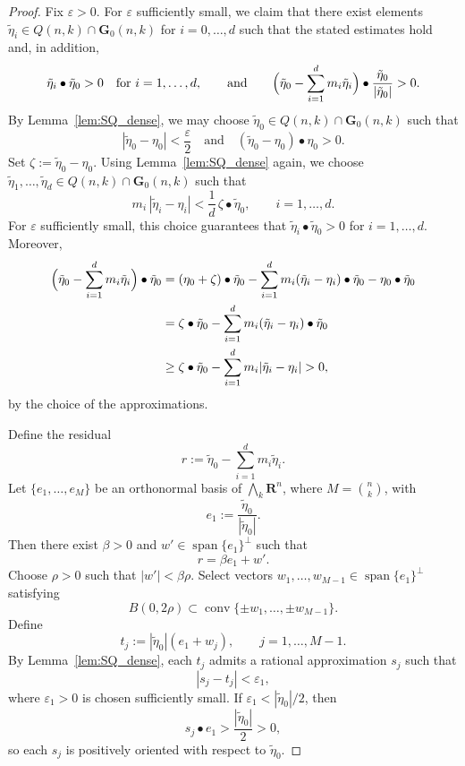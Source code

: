 \documentclass[a4paper,twoside,reqno]{article}
\theoremstyle{definition}
\theoremstyle{remark}
\theoremstyle{plain}
\theoremstyle{remark}
\theoremstyle{definition}
\newcommand{\ograss}[2]{\mathbf{G}_0(#1,#2)}
\newcommand{\R}{\mathbf{R}}
\begin{document}
\begin{proof}
    Fix $\varepsilon>0$.
    For $\varepsilon$ sufficiently small, we claim that there exist elements
    $\tilde\eta_i\in Q(n,k)\cap\ograss nk$ for $i=0,\dots,d$ such that the stated
    estimates hold and, in addition,
    \[
        \tilde\eta_i\bullet\tilde\eta_0>0
        \quad\text{for }i=1,\dots,d,
        \qquad\text{and}\qquad
        \Bigl(\tilde\eta_0-\sum_{i=1}^d m_i\tilde\eta_i\Bigr)\bullet
        \frac{\tilde\eta_0}{|\tilde\eta_0|}>0.
    \]
    By Lemma~\ref{lem:SQ_dense}, we may choose
    $\tilde\eta_0\in Q(n,k)\cap\ograss nk$ such that
    \[
        |\tilde\eta_0-\eta_0|<\frac{\varepsilon}{2}
        \quad\text{and}\quad
        (\tilde\eta_0-\eta_0)\bullet\eta_0>0.
    \]
    Set $\zeta:=\tilde\eta_0-\eta_0$. Using Lemma~\ref{lem:SQ_dense} again, we 
    choose $\tilde\eta_1,\dots,\tilde\eta_d\in Q(n,k)\cap\ograss nk$ such that
    \[
        m_i\,|\tilde\eta_i-\eta_i|
        <
        \frac{1}{d}\,\zeta\bullet\tilde\eta_0,
        \qquad i=1,\dots,d.
    \]
    For $\varepsilon$ sufficiently small, this choice guarantees that
    $\tilde\eta_i\bullet\tilde\eta_0>0$ for $i=1,\dots,d$.
    Moreover,
    \begin{align*}
        \Bigl(\tilde\eta_0-\sum_{i=1}^d m_i\tilde\eta_i\Bigr)\bullet\tilde\eta_0
        &=
        (\eta_0+\zeta)\bullet\tilde\eta_0
        -\sum_{i=1}^d m_i(\tilde\eta_i-\eta_i)\bullet\tilde\eta_0
        -\eta_0\bullet\tilde\eta_0
        \\
        &=
        \zeta\bullet\tilde\eta_0
        -\sum_{i=1}^d m_i(\tilde\eta_i-\eta_i)\bullet\tilde\eta_0
        \\
        &\ge
        \zeta\bullet\tilde\eta_0
        -\sum_{i=1}^d m_i|\tilde\eta_i-\eta_i|
        >0,
    \end{align*}
    by the choice of the approximations.

    Define the residual
    \[
        r:=\tilde\eta_0-\sum_{i=1}^d m_i\tilde\eta_i.
    \]
    Let $\{e_1,\dots,e_M\}$ be an orthonormal basis of
    $\bigwedge_k\R^n$, where $M=\binom{n}{k}$, with
    \[
        e_1:=\frac{\tilde\eta_0}{|\tilde\eta_0|}.
    \]
    Then there exist $\beta>0$ and $w'\in\operatorname{span}\{e_1\}^\perp$ such that
    \[
        r=\beta e_1+w'.
    \]
    Choose $\rho>0$ such that $|w'|<\beta\rho$.
    Select vectors $w_1,\dots,w_{M-1}\in\operatorname{span}\{e_1\}^\perp$ satisfying
    \[
        B(0,2\rho)\subset\operatorname{conv}\{\pm w_1,\dots,\pm w_{M-1}\}.
    \]
    Define
    \[
        t_j:=|\tilde\eta_0|(e_1+w_j),\qquad j=1,\dots,M-1.
    \]
    By Lemma~\ref{lem:SQ_dense}, each $t_j$ admits a rational approximation $s_j$
    such that
    \[
        |s_j-t_j|<\varepsilon_1,
    \]
    where $\varepsilon_1>0$ is chosen sufficiently small.
    If $\varepsilon_1<|\tilde\eta_0|/2$, then
    \[
        s_j\bullet e_1>\frac{|\tilde\eta_0|}{2}>0,
    \]
    so each $s_j$ is positively oriented with respect to $\tilde\eta_0$.


\end{proof}
\end{document}
